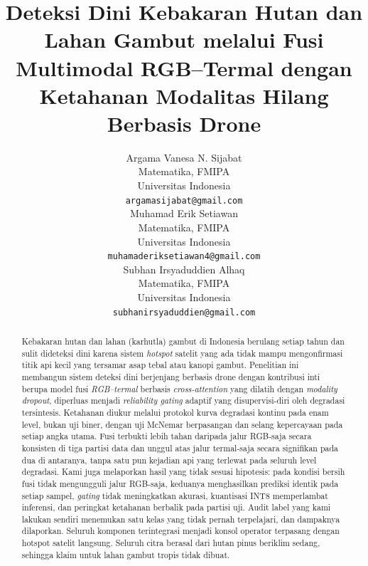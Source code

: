 %

\title{Deteksi Dini Kebakaran Hutan dan Lahan Gambut melalui Fusi Multimodal
RGB--Termal dengan Ketahanan Modalitas Hilang Berbasis Drone}

\author{
Argama Vanesa N. Sijabat \\
Matematika, FMIPA \\
Universitas Indonesia \\
\texttt{argamasijabat@gmail.com} \\
\And
Muhamad Erik Setiawan \\
Matematika, FMIPA \\
Universitas Indonesia \\
\texttt{muhamaderiksetiawan4@gmail.com} \\
\AND
Subhan Irsyaduddien Alhaq \\
Matematika, FMIPA \\
Universitas Indonesia \\
\texttt{subhanirsyaduddien@gmail.com} \\
}

\maketitle

\begin{abstract}
Kebakaran hutan dan lahan (karhutla) gambut di Indonesia berulang setiap tahun
dan sulit dideteksi dini karena sistem \emph{hotspot} satelit yang ada tidak
mampu mengonfirmasi titik api kecil yang tersamar asap tebal atau kanopi gambut.
Penelitian ini membangun sistem deteksi dini berjenjang berbasis drone dengan
kontribusi inti berupa model fusi \emph{RGB--termal} berbasis
\emph{cross-attention} yang dilatih dengan \emph{modality dropout}, diperluas
menjadi \emph{reliability gating} adaptif yang disupervisi-diri oleh degradasi
tersintesis. Ketahanan diukur melalui protokol kurva degradasi kontinu pada enam
level, bukan uji biner, dengan uji McNemar berpasangan dan selang kepercayaan
pada setiap angka utama. Fusi terbukti lebih tahan daripada jalur RGB-saja
secara konsisten di tiga partisi data dan unggul atas jalur termal-saja secara
signifikan pada dua di antaranya, tanpa satu pun kejadian api yang terlewat pada
seluruh level degradasi. Kami juga melaporkan hasil yang tidak sesuai hipotesis:
pada kondisi bersih fusi tidak mengungguli jalur RGB-saja, keduanya
menghasilkan prediksi identik pada setiap sampel, \emph{gating} tidak
meningkatkan akurasi, kuantisasi INT8 memperlambat inferensi, dan peringkat
ketahanan berbalik pada partisi uji. Audit label yang kami lakukan sendiri
menemukan satu kelas yang tidak pernah terpelajari, dan dampaknya dilaporkan.
Seluruh komponen terintegrasi menjadi konsol operator terpasang dengan hotspot
satelit langsung. Seluruh citra berasal dari hutan pinus beriklim sedang,
sehingga klaim untuk lahan gambut tropis tidak dibuat.
\end{abstract}
